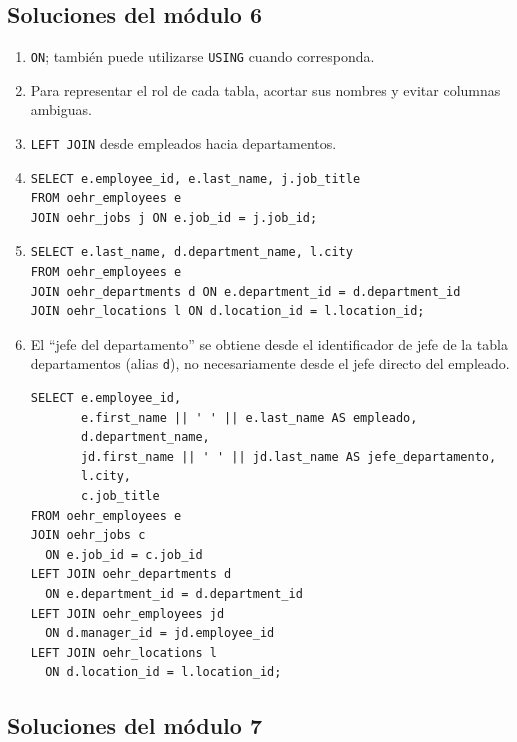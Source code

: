 \documentclass[11pt,a4paper]{article}
\newcommand{\campo}[1]{\texttt{#1}}
\begin{document}
\subsection{Soluciones del módulo 6}

\begin{enumerate}[label=\textbf{M6.\arabic*}]
  \item \campo{ON}; también puede utilizarse \campo{USING} cuando corresponda.
  \item Para representar el rol de cada tabla, acortar sus nombres y evitar columnas ambiguas.
  \item \campo{LEFT JOIN} desde empleados hacia departamentos.
  \item
\begin{lstlisting}
SELECT e.employee_id, e.last_name, j.job_title
FROM oehr_employees e
JOIN oehr_jobs j ON e.job_id = j.job_id;
\end{lstlisting}
  \item
\begin{lstlisting}
SELECT e.last_name, d.department_name, l.city
FROM oehr_employees e
JOIN oehr_departments d ON e.department_id = d.department_id
JOIN oehr_locations l ON d.location_id = l.location_id;
\end{lstlisting}
  \item El ``jefe del departamento'' se obtiene desde el identificador de jefe de la tabla
  departamentos (alias \campo{d}), no necesariamente desde el jefe directo del empleado.
\begin{lstlisting}
SELECT e.employee_id,
       e.first_name || ' ' || e.last_name AS empleado,
       d.department_name,
       jd.first_name || ' ' || jd.last_name AS jefe_departamento,
       l.city,
       c.job_title
FROM oehr_employees e
JOIN oehr_jobs c
  ON e.job_id = c.job_id
LEFT JOIN oehr_departments d
  ON e.department_id = d.department_id
LEFT JOIN oehr_employees jd
  ON d.manager_id = jd.employee_id
LEFT JOIN oehr_locations l
  ON d.location_id = l.location_id;
\end{lstlisting}
\end{enumerate}

\subsection{Soluciones del módulo 7}
\end{document}
